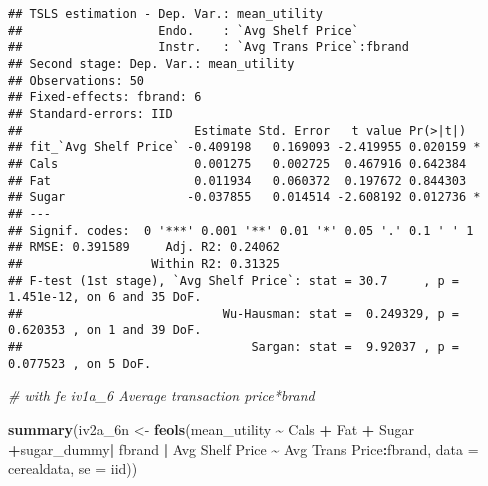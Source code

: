 \documentclass[
]{article}
\newenvironment{Shaded}{\begin{snugshade}}{\end{snugshade}}
\newcommand{\AttributeTok}[1]{\textcolor[rgb]{0.13,0.29,0.53}{#1}}
\newcommand{\CommentTok}[1]{\textcolor[rgb]{0.56,0.35,0.01}{\textit{#1}}}
\newcommand{\FunctionTok}[1]{\textcolor[rgb]{0.13,0.29,0.53}{\textbf{#1}}}
\newcommand{\NormalTok}[1]{#1}
\newcommand{\OtherTok}[1]{\textcolor[rgb]{0.56,0.35,0.01}{#1}}
\newcommand{\SpecialCharTok}[1]{\textcolor[rgb]{0.81,0.36,0.00}{\textbf{#1}}}
\newcommand{\StringTok}[1]{\textcolor[rgb]{0.31,0.60,0.02}{#1}}
\begin{document}
\begin{verbatim}
## TSLS estimation - Dep. Var.: mean_utility
##                   Endo.    : `Avg Shelf Price`
##                   Instr.   : `Avg Trans Price`:fbrand
## Second stage: Dep. Var.: mean_utility
## Observations: 50
## Fixed-effects: fbrand: 6
## Standard-errors: IID 
##                        Estimate Std. Error   t value Pr(>|t|)    
## fit_`Avg Shelf Price` -0.409198   0.169093 -2.419955 0.020159 *  
## Cals                   0.001275   0.002725  0.467916 0.642384    
## Fat                    0.011934   0.060372  0.197672 0.844303    
## Sugar                 -0.037855   0.014514 -2.608192 0.012736 *  
## ---
## Signif. codes:  0 '***' 0.001 '**' 0.01 '*' 0.05 '.' 0.1 ' ' 1
## RMSE: 0.391589     Adj. R2: 0.24062
##                  Within R2: 0.31325
## F-test (1st stage), `Avg Shelf Price`: stat = 30.7     , p = 1.451e-12, on 6 and 35 DoF.
##                            Wu-Hausman: stat =  0.249329, p = 0.620353 , on 1 and 39 DoF.
##                                Sargan: stat =  9.92037 , p = 0.077523 , on 5 DoF.
\end{verbatim}

\begin{Shaded}
\begin{Highlighting}[]
\CommentTok{\# with fe  iv1a\_6 Average transaction price*brand }

\FunctionTok{summary}\NormalTok{(iv2a\_6n }\OtherTok{\textless{}{-}} \FunctionTok{feols}\NormalTok{(mean\_utility }\SpecialCharTok{\textasciitilde{}}\NormalTok{ Cals }\SpecialCharTok{+}\NormalTok{ Fat }\SpecialCharTok{+}\NormalTok{ Sugar }\SpecialCharTok{+}\NormalTok{sugar\_dummy}\SpecialCharTok{|}\NormalTok{ fbrand }\SpecialCharTok{|} \StringTok{\textasciigrave{}}\AttributeTok{Avg Shelf Price}\StringTok{\textasciigrave{}} \SpecialCharTok{\textasciitilde{}} \StringTok{\textasciigrave{}}\AttributeTok{Avg Trans Price}\StringTok{\textasciigrave{}}\SpecialCharTok{:}\NormalTok{fbrand, }
                        \AttributeTok{data =}\NormalTok{ cerealdata, }\AttributeTok{se =} \StringTok{\textquotesingle{}iid\textquotesingle{}}\NormalTok{))}
\end{Highlighting}
\end{Shaded}
\end{document}
